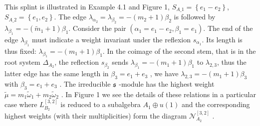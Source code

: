 \documentclass[12pt]{article}
\begin{document}
\begin{itemize}
This splint is illustrated in Example 4.1 and Figure 1, 
$S_{A\_1}=\left\{ e_{1}-e_{2}\right\} $, $S_{A\_2}=\left\{
e_{1},e_{2}\right\} $. The edge $\lambda _{\alpha _{2}}=\lambda
_{\beta _{2}}=-\left( m_{2}+1\right) \beta _{2}$ is followed by
$\lambda _{\beta _{1}}=-\left( \widetilde{m}_{1}+1\right) \beta
_{1}$. Consider the pair $\left( \alpha
_{1}=e_{1}-e_{2},\beta _{1}=e_{1}\right)$. The end of the edge
$\lambda _{\beta _{1}}$ must indicate a weight
invariant under the reflexion $s_{\alpha _{1}}$.  Its length is thus fixed: 
$\lambda _{\beta _{1}}=-\left( m_{1}+1\right) \beta _{1}$. In the
coimage of
the second stem, that is in the root system $\Delta_{A_{2}}$, the reflection 
$s_{\beta _{2}}$ sends $\lambda _{\beta _{1}}=-\left(
m_{1}+1\right) \beta
_{1}$ to $\lambda _{2,3}$, thus the latter edge has the same length in $%
\beta _{3}=e_{1}+e_{3}$ , we have $\lambda _{2,3}=-\left(
m_{1}+1\right)
\beta _{3}$ with $\beta _{3}=e_{1}+e_{3}$ . The irreducible $\frak{s}$%
-module has the highest weight $\widetilde{\mu }=m_{1}\widetilde{\omega }%
_{1}+m_{2}\widetilde{\omega }_{2}$ . In Figure 1 we see the
details of these relations in a particular case where
$L_{B_{2}}^{\left[ 3,2\right] }$ is reduced to a subalgebra
$A_{1}\oplus u\left( 1\right) $ and the
corresponding highest weights (with their multiplicities) form the diagram $%
\mathcal{N}_{A_2}^{\left[ 3,2\right] }$ .
\end{itemize}

\end{document}
